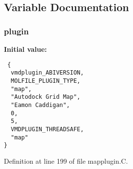 \subsection{Variable Documentation}
\subsubsection{ plugin\hspace{0.3cm}{\tt  [static]}}\label{mapplugin_8C_a1}


{\bf Initial value:}

\footnotesize\begin{verbatim} {
  vmdplugin_ABIVERSION,   
  MOLFILE_PLUGIN_TYPE,    
  "map",                  
  "Autodock Grid Map",    
  "Eamon Caddigan",       
  0,                      
  5,                      
  VMDPLUGIN_THREADSAFE,   
  "map"                   
}\end{verbatim}\normalsize 


Definition at line 199 of file mapplugin.C.